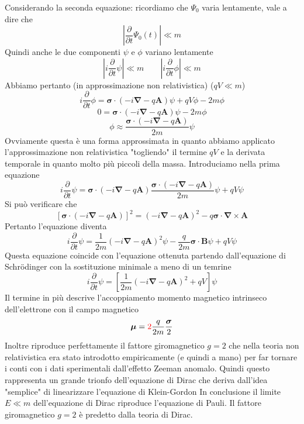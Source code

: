 Considerando la seconda equazione: ricordiamo che $\Psi_0$ varia lentamente, vale a dire che
$$
\left| \frac{\partial}{\partial t} \Psi_0(t) \right| \ll m
$$
Quindi anche le due componenti $\psi$ e $\phi$ variano lentamente
$$
\left| i \frac{\partial}{\partial t} \psi \right| \ll m \qquad \left| i \frac{\partial}{\partial t} \phi \right| \ll m
$$
Abbiamo pertanto (in approssimazione non relativistica) ($qV \ll m$)
$$
i \frac{\partial}{\partial t} \phi = \boldsymbol{\sigma} \cdot (-i\boldsymbol{\nabla} - q\mathbf{A})\psi + qV\phi - 2m\phi
$$
$$
0 = \boldsymbol{\sigma} \cdot (-i\boldsymbol{\nabla} - q\mathbf{A})\psi - 2m\phi
$$
$$
\phi \approx \frac{\boldsymbol{\sigma} \cdot (-i\boldsymbol{\nabla} - q\mathbf{A})}{2m} \psi
$$
Ovviamente questa è una forma approssimata in quanto abbiamo applicato l'approssimazione non relativistica "togliendo" il termine $qV$ e la derivata temporale in quanto molto più piccoli della massa. Introduciamo nella prima equazione
$$
i \frac{\partial}{\partial t} \psi = \boldsymbol{\sigma} \cdot (-i\boldsymbol{\nabla} - q\mathbf{A}) \frac{\boldsymbol{\sigma} \cdot (-i\boldsymbol{\nabla} - q\mathbf{A})}{2m} \psi + qV\psi
$$
Si può verificare che 
$$
[\boldsymbol{\sigma} \cdot (-i\boldsymbol{\nabla} - q\mathbf{A})]^2 = (-i\boldsymbol{\nabla} - q\mathbf{A})^2 - q\boldsymbol{\sigma} \cdot \boldsymbol{\nabla} \times \mathbf{A}
$$
Pertanto l'equazione diventa
$$
i \frac{\partial}{\partial t} \psi = \frac{1}{2m}(-i\boldsymbol{\nabla} - q\mathbf{A})^2 \psi - \frac{q}{2m} \boldsymbol{\sigma} \cdot \mathbf{B} \psi + qV\psi
$$
Questa equazione coincide con l'equazione ottenuta partendo dall'equazione di Schr\"odinger con la sostituzione minimale a meno di un temrine
$$
i \frac{\partial}{\partial t} \psi = \left[ \frac{1}{2m}(-i\boldsymbol{\nabla} - q\mathbf{A})^2 + qV \right] \psi
$$
Il termine in più descrive l'accoppiamento momento magnetico intrinseco dell'elettrone con il campo magnetico
$$
\boldsymbol{\mu} = \textcolor{red}{2} \frac{q}{2m} \frac{\boldsymbol{\sigma}}{2}
$$
Inoltre riproduce perfettamente il fattore giromagnetico $g=2$ che nella teoria non relativistica era stato introdotto empiricamente (e quindi a mano) per far tornare i conti con i dati sperimentali dall'effetto Zeeman anomalo. Quindi questo rappresenta un grande trionfo dell'equazione di Dirac che deriva dall'idea "semplice" di linearizzare l'equazione di Klein-Gordon In conclusione il limite $E\ll m$ dell'equazione di Dirac riproduce l'equazione di Pauli. Il fattore giromagnetico $g=2$ è predetto dalla teoria di Dirac.
